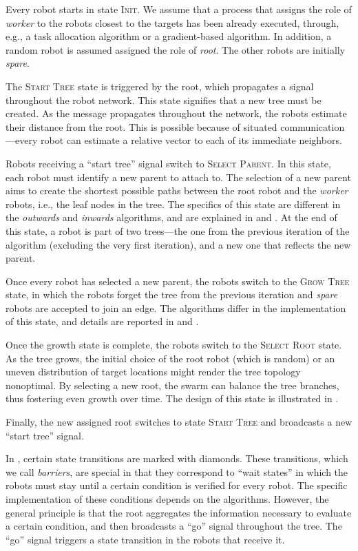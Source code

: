 Every robot starts in state \textsc{Init}. We assume that a process
that assigns the role of \emph{worker} to the robots closest to the
targets has been already executed, through, e.g., a task allocation
algorithm or a gradient-based algorithm. In addition, a random robot
is assumed assigned the role of \emph{root}. The other robots are
initially \emph{spare}.

The \textsc{Start Tree} state is triggered by the root, which
propagates a signal throughout the robot network. This state signifies
that a new tree must be created. As the message propagates throughout
the network, the robots estimate their distance from the root. This is
possible because of situated communication---every robot can estimate
a relative vector to each of its immediate neighbors.

Robots receiving a ``start tree'' signal switch to \textsc{Select
  Parent}. In this state, each robot must identify a new parent to
attach to. The selection of a new parent aims to create the shortest
possible paths between the root robot and the \emph{worker} robots,
i.e., the leaf nodes in the tree. The specifics of this state are
different in the \emph{outwards} and \emph{inwards} algorithms, and
are explained in  and . At the
end of this state, a robot is part of two trees---the one from the
previous iteration of the algorithm (excluding the very first
iteration), and a new one that reflects the new parent.

Once every robot has selected a new parent, the robots switch to the
\textsc{Grow Tree} state, in which the robots forget the tree from the
previous iteration and \emph{spare} robots are accepted to join an edge. 
The algorithms differ in the implementation of this state, and details
are reported in  and .

Once the growth state is complete, the robots switch to the
\textsc{Select Root} state. As the tree grows, the initial choice of
the root robot (which is random) or an uneven distribution of target
locations might render the tree topology nonoptimal. By selecting a new
root, the swarm can balance the tree branches, thus fostering even
growth over time. The design of this state is illustrated in
.

Finally, the new assigned root switches to state \textsc{Start Tree}
and broadcasts a new ``start tree'' signal.

In , certain state transitions are marked with
diamonds. These transitions, which we call \emph{barriers}, are
special in that they correspond to ``wait states'' in which the robots
must stay until a certain condition is verified for every robot. The
specific implementation of these conditions depends on the
algorithms. However, the general principle is that the root aggregates
the information necessary to evaluate a certain condition, and then
broadcasts a ``go'' signal throughout the tree. The ``go'' signal
triggers a state transition in the robots that receive it.

